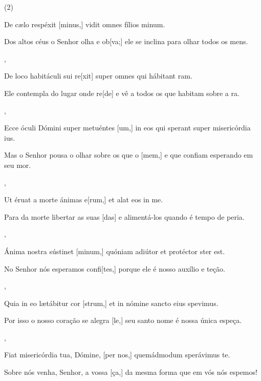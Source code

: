 \SetVersePairs(2){
	{\item {}De cælo respéxit [minus,] vidit omnes fílios \-mi\-num.~\Responsorium}%
		{\item {}Dos altos céus o Senhor olha e ob ele se inclina para olhar todos os mens.~\Responsorium},
	{\item {}De loco habitáculi sui re[xit] super omnes qui hábitant ram.~\Responsorium}%
		{\item {}Ele contempla do lugar onde re[de] e vê a todos os que habitam sobre a ra.~\Responsorium},
	{\item {}Ecce óculi Dómini super metuéntes [um,] in eos qui sperant super misericórdia ius.~\Responsorium}%
		{\item {}Mas o Senhor pousa o olhar sobre os que o [\-mem,] e que confiam esperando em seu mor.~\Responsorium},
	{\item {}Ut éruat a morte ánimas e[rum,] et alat eos in me.~\Responsorium}%
		{\item {}Para da morte libertar as suas  e alimentá-los quando é tempo de peria.~\Responsorium},
	{\item {}Ánima nostra sústinet [minum,] quóniam ad\-iútor et protéctor ster est.~\Responsorium}%
		{\item {}No Senhor nós esperamos confi porque ele é nosso auxílio e teção.~\Responsorium},
	{\item {}Quia in eo lætábitur cor [strum,] et in nómine sancto eius spevimus.~\Responsorium}%
		{\item {}Por isso o nosso coração se alegra  seu santo nome é nossa única espeça.~\Responsorium},
	{\item {}Fiat misericórdia tua, Dómine, [per nos,] quemádmodum sperávimus  te.~\Responsorium}%
		{\item {}Sobre nós venha, Senhor, a vossa  da mes\-ma forma que em vós nós espemos!~\Responsorium}
}
